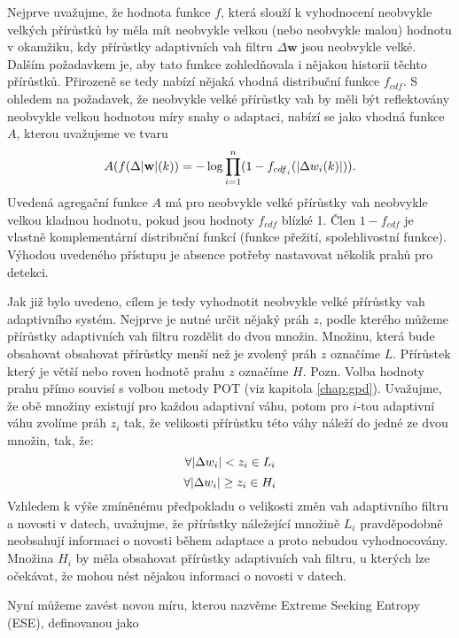 \par
Nejprve uvažujme, že hodnota funkce $f$, která slouží k vyhodnocení neobvykle velkých přírůstků by měla mít neobvykle velkou (nebo neobvykle malou) hodnotu v okamžiku, kdy přírůstky adaptivních vah filtru $\Delta \textbf{w}$ jsou neobvykle velké. Dalším požadavkem je, aby tato funkce zohledňovala i nějakou historii těchto přírůstků. Přirozeně se tedy nabízí nějaká  vhodná distribuční funkce $f_{cdf}$. S ohledem na požadavek, že neobvykle velké přírůstky vah by měli být reflektovány neobvykle velkou hodnotou míry snahy o adaptaci, nabízí se jako vhodná funkce $A$, kterou uvažujeme ve tvaru
\begin{equation} \label{eq:ND_score}
A(f(\Delta \lvert\textbf{w}\rvert(k)) = -\log \prod_{i=1}^n(1 - f_{{cdf}_i}(\lvert \Delta  w_i(k)\rvert)).
\end{equation}
Uvedená agregační funkce $A$ má pro neobvykle velké přírůstky vah neobvykle velkou kladnou hodnotu, pokud jsou hodnoty $f_{cdf}$ blízké 1. Člen $1-f_{cdf}$ je vlastně komplementární distribuční funkcí (funkce přežití, spolehlivostní funkce). Výhodou uvedeného přístupu je absence potřeby nastavovat několik prahů pro detekci.
\par 
Jak již bylo uvedeno, cílem je tedy vyhodnotit neobvykle velké přírůstky vah adaptivního systém. Nejprve je nutné určit nějaký práh $z$, podle kterého můžeme přírůstky adaptivních vah filtru rozdělit do dvou množin. Množinu, která bude obsahovat obsahovat přírůstky menší než je zvolený práh $z$ označíme $L$. Přírůstek který je větší nebo roven hodnotě prahu $z$ označíme $H$. Pozn. Volba hodnoty prahu přímo souvisí s volbou metody POT (viz kapitola \ref{chap:gpd}). Uvažujme, že obě množiny existují pro každou adaptivní váhu, potom pro $i$-tou adaptivní váhu zvolíme práh $z_i$ tak, že velikosti přírůstku této váhy náleží do jedné ze dvou množin, tak, že:
\begin{equation}
\forall \lvert\Delta w_i\rvert < z_i \in L_i
\end{equation}
\begin{equation}
\forall \lvert\Delta w_i\rvert \geq z_i \in H_i
\end{equation}
Vzhledem k výše zmíněnému předpokladu o velikosti změn vah adaptivního filtru a novosti v datech, uvažujme, že přírůstky náležející množině $L_i$ pravděpodobně neobsahují informaci o novosti během adaptace a proto nebudou vyhodnocovány. Množina $H_i$ by měla obsahovat přírůstky adaptivních vah filtru, u kterých lze očekávat, že mohou nést nějakou informaci o novosti v datech.
\par
Nyní můžeme zavést novou míru, kterou nazvěme Extreme Seeking Entropy (ESE), definovanou jako

